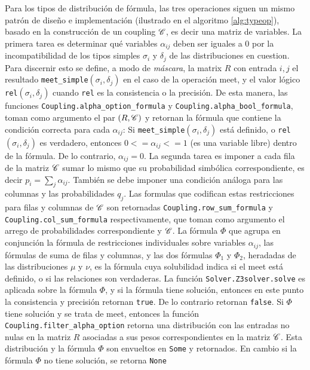 Para los tipos de distribución de fórmula, las tres operaciones siguen
un mismo patrón de diseño e implementación (ilustrado en el algoritmo \ref{alg:typeop}), basado en la construcción
de un coupling $\mathscr{C}$, es decir una matriz de variables. La
primera tarea es determinar qué variables $\alpha_{ij}$ deben ser
iguales a 0 por la incompatibilidad de los tipos simples $\sigma_i$ y
$\delta_j$ de las distribuciones en cuestion. Para discernir esto se
define, a modo de \emph{máscara}, la matrix $R$ con entrada $i,j$ el
resultado \verb|meet_simple|$(\sigma_i,\delta_j)$ en el caso de la
operación meet, y el valor lógico \verb|rel|$(\sigma_i,\delta_j)$
cuando \verb|rel| es la consistencia o la precisión. De esta manera,
las funciones \verb|Coupling.alpha_option_formula| y
\verb|Coupling.alpha_bool_formula|, toman como argumento el par
$(R,\mathscr{C})$ y retornan la fórmula que contiene la condición
correcta para cada $\alpha_{ij}$: Si
\verb|meet_simple|$(\sigma_i,\delta_j)$ está definido, o
\verb|rel|$(\sigma_i,\delta_j)$ es verdadero, entonces
$0<=\alpha_{ij}<= 1$ (es una variable libre) dentro de la fórmula. De
lo contrario, $\alpha_{ij} = 0$. La segunda tarea es imponer a cada
fila de la matriz $\mathscr{C}$ sumar lo mismo que su probabilidad
simbólica correspondiente, es decir $p_i = \sum_j\alpha_{ij}$. También
se debe imponer una condición análoga para las columnas y las
probabilidades $q_j$. Las formulas que codifican estas restricciones
para filas y columnas de $\mathscr{C}$ son retornadas
\verb|Coupling.row_sum_formula| y \verb|Coupling.col_sum_formula|
respectivamente, que toman como argumento el arrego de probabilidades
correspondiente y $\mathscr{C}$. La fórmula $\Phi$ que agrupa en
conjunción la fórmula de restricciones individuales sobre variables
$\alpha_{ij}$, las fórmulas de suma de filas y columnas, y las dos
fórmulas $\Phi_1$ y $\Phi_2$, heradadas de las distribuciones $\mu$ y
$\nu$, es la fórmula cuya solubilidad indica si el meet está definido,
o si las relaciones son verdaderas. La función
\verb|Solver.Z3solver.solve| es aplicada sobre la fórmula $\Phi$, y si
la fórmula tiene solución, entonces en este punto la consistencia y
precisión retornan \verb|true|. De lo contrario retornan
\verb|false|. Si $\Phi$ tiene solución y se trata de meet, entonces la
función \verb|Coupling.filter_alpha_option| retorna una distribución
con las entradas no nulas en la matriz $R$ asociadas a sus pesos
correspondientes en la matriz $\mathscr{C}$. Esta distribución y la
fórmula $\Phi$ son envueltos en \verb|Some| y retornados. En cambio si
la fórmula $\Phi$ no tiene solución, se retorna \verb|None|


